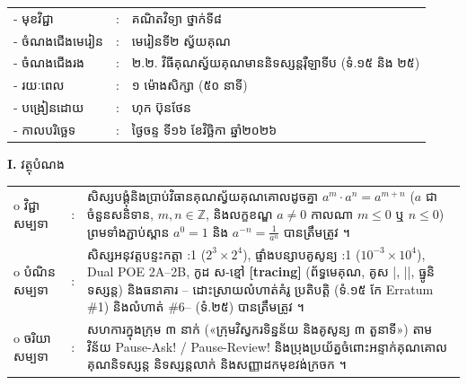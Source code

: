 \documentclass[a4paper,10pt]{article}
\newcommand{\wcirc}{{\CourierBullet\fontsize{9.5pt}{11pt}\selectfont o}}
\newcommand{\en}[1]{{\TimesEn #1}}
\newcommand{\cnum}[1]{{\fontsize{10.5pt}{12pt}\selectfont\ding{\numexpr181+#1\relax}}\hspace{0.15em}}
\begin{document}
{\renewcommand{\arraystretch}{0.96}
\hspace*{3.4cm}%
\begin{tabular}{@{}l l L{10.8cm}@{}}
  - \hspace{0.35cm} មុខវិជ្ជា & : & គណិតវិទ្យា ថ្នាក់ទី៨ \\
  - \hspace{0.35cm} ចំណងជើងមេរៀន & : & មេរៀនទី២ ស្វ័យគុណ \\
  - \hspace{0.35cm} ចំណងជើងរង & : & ២.២. វិធីគុណស្វ័យគុណមាននិទស្សន្តរ៉ឺឡាទីប (ទំ.១៥ និង ២៥) \\
  - \hspace{0.35cm} រយៈពេល & : & ១ ម៉ោងសិក្សា (៥០ នាទី) \\
  - \hspace{0.35cm} បង្រៀនដោយ & : & ហុក ប៊ុនថែន \\
  - \hspace{0.35cm} កាលបរិច្ឆេទ & : & ថ្ងៃចន្ទ ទី១៦ ខែវិច្ឆិកា ឆ្នាំ២០២៦ \\
\end{tabular}

\vspace{1pt}

\textbf{I.} {\muol វត្ថុបំណង}\\[1pt]
\hspace*{0.55cm}%
\begin{tabular}{@{}l l L{14.2cm}@{}}
  \wcirc \hspace{0.25cm} វិជ្ជាសម្បទា & : & សិស្សបង្គុំនិងប្រាប់វិធានគុណស្វ័យគុណគោលដូចគ្នា $a^m \cdot a^n = a^{m+n}$ ($a$ ជាចំនួនសនិទាន, $m, n \in \mathbb{Z}$, និងលក្ខខណ្ឌ $a \neq 0$ កាលណា $m \le 0$ ឬ $n \le 0$) ព្រមទាំងភ្ជាប់ស្ពាន $a^0 = 1$ និង $a^{-n} = \frac{1}{a^n}$ បានត្រឹមត្រូវ ។ \\
  \wcirc \hspace{0.25cm} បំណិនសម្បទា & : & សិស្សអនុវត្តបន្ទះកត្តា \en{1:1} ($2^3\times 2^4$), ផ្ទាំងបន្សាបគូសូន្យ \en{1:1} ($10^{-3}\times 10^4$), \en{Dual POE 2A--2B}, កូដ ស-ខ្មៅ \textbf{[tracing]} (ព័ទ្ធមេគុណ, គូស \en{|}, \en{||}, ធ្នូនិទស្សន្ត) និងធនាគារ \cnum{1}--\cnum{5} ដោះស្រាយលំហាត់គំរូ ប្រតិបត្តិ (ទំ.១៥ កែ \en{Erratum \#1}) និងលំហាត់ \en{\#6--} (ទំ.២៥) បានត្រឹមត្រូវ ។ \\
  \wcirc \hspace{0.25cm} ចរិយាសម្បទា & : & សហការក្នុងក្រុម ៣ នាក់ («ក្រុមវិស្វករទិន្នន័យ និងគូសូន្យ ៣ តួនាទី») តាមវិន័យ \en{Pause-Ask! / Pause-Review!} និងប្រុងប្រយ័ត្នចំពោះអន្ទាក់គុណគោល គុណនិទស្សន្ត និទស្សន្តលាក់ \en{1} និងសញ្ញាដកមុខវង់ក្រចក ។ \\
\end{tabular}

}
\end{document}
